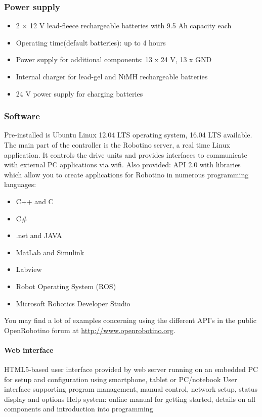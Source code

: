 \documentclass[12pt,twoside]{article}
\begin{document}
\begin{appendix}
\subsubsection{Power supply}
\begin{itemize}
\item 2 $\times$ 12 V lead-fleece rechargeable batteries with 9.5 Ah
  capacity each
\item Operating time(default batteries): up to 4 hours
\item Power supply for additional components: 13 x 24 V, 13 x GND
\item Internal charger for lead-gel and NiMH rechargeable batteries
\item 24 V power supply for charging batteries
\end{itemize}

\subsubsection{Software}
Pre-installed is Ubuntu Linux 12.04 LTS operating system, 16.04 LTS available.
The main part of the controller is the Robotino server, a real time Linux
application. It controls the drive units and provides interfaces to
communicate with external PC applications via wifi. Also provided: API
2.0 with libraries which allow you to create applications for Robotino
in numerous programming languages:

\begin{itemize}
\item C++ and C 
\item C\# 
\item .net and JAVA 
\item MatLab and Simulink
\item Labview
\item Robot Operating System (ROS)
\item Microsoft Robotics Developer Studio
\end{itemize}

You may find a lot of examples concerning using the different API's in
the public OpenRobotino forum at \url{http://www.openrobotino.org}.

\paragraph{Web interface}
HTML5-based user interface provided by web server running on an embedded
PC for setup and configuration using smartphone, tablet or PC/notebook
User interface supporting program management, manual control, network
setup, status display and options Help system: online manual for
getting started, details on all components and introduction into
programming


\end{appendix}
\end{document}
